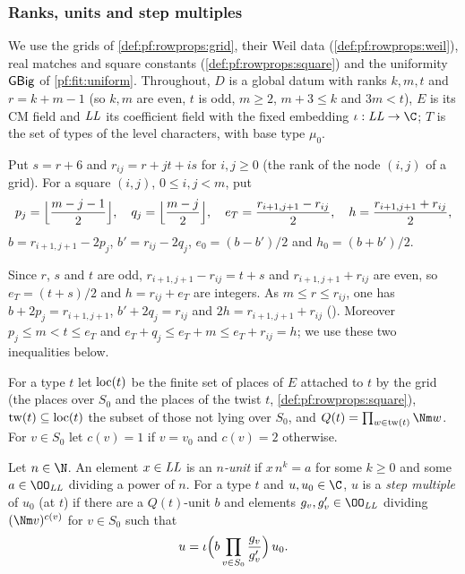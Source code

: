 \subsubsection{Ranks, units and step multiples}

We use the grids of \cref{def:pf:rowprops:grid}, their Weil data (\cref{def:pf:rowprops:weil}), real matches and square
constants (\cref{def:pf:rowprops:square}) and the uniformity $\mathsf{GBig}$ of \cref{pf:fit:uniform}. Throughout, $D$ is a
global datum with ranks $k,m,t$ and $r=k+m-1$ (so $k,m$ are even, $t$ is odd, $m\ge2$, $m+3\le k$ and $3m<t$), $E$ is
its CM field and $\mathit{LL}$ its coefficient field with the fixed embedding $\shthetaemb:\shthetaLL\to\C$; $T$ is the set
of types of the level characters, with base type $\mu_0$.

\begin{definition}\label{pf:sh-theta:ranks}
Put $s=r+6$ and $r_{ij}=r+jt+is$ for $i,j\ge0$ (the rank of the node $(i,j)$ of a grid). For a square $(i,j)$,
$0\le i,j<m$, put
\[
p_j=\Bigl\lfloor\frac{m-j-1}2\Bigr\rfloor,\quad q_j=\Bigl\lfloor\frac{m-j}2\Bigr\rfloor,\quad
e_T=\frac{r_{i+1,j+1}-r_{ij}}2,\quad h=\frac{r_{i+1,j+1}+r_{ij}}2,
\]
$b=r_{i+1,j+1}-2p_j$, $b'=r_{ij}-2q_j$, $e_0=(b-b')/2$ and $h_0=(b+b')/2$.
\end{definition}

Since $r$, $s$ and $t$ are odd, $r_{i+1,j+1}-r_{ij}=t+s$ and $r_{i+1,j+1}+r_{ij}$ are even, so $e_T=(t+s)/2$ and
$h=r_{ij}+e_T$ are integers. As $m\le r\le r_{ij}$, one has $b+2p_j=r_{i+1,j+1}$, $b'+2q_j=r_{ij}$ and
$2h=r_{i+1,j+1}+r_{ij}$ (). Moreover $p_j\le m<t\le e_T$ and
$e_T+q_j\le e_T+m\le e_T+r_{ij}=h$; we use these two inequalities below.

For a type $t$ let $\mathrm{loc}(t)$ be the finite set of places of $E$ attached to $t$ by the grid (the places over $S_0$
and the places of the twist $t$, \cref{def:pf:rowprops:square}), $\mathrm{tw}(t)\subseteq\mathrm{loc}(t)$ the subset of
those not lying over $S_0$, and $Q(t)=\prod_{w\in\shthetatw(t)}\Nm w$. For $v\in S_0$ let $c(v)=1$ if $v=v_0$ and
$c(v)=2$ otherwise.

\begin{definition}\label{pf:sh-theta:units}
Let $n\in\N$. An element $x\in\mathit{LL}$ is an \emph{$n$-unit} if $x\,n^k=a$ for some $k\ge0$ and some
$a\in\OO_{\shthetaLL}$ dividing a power of $n$. For a type $t$ and $u,u_0\in\C$, $u$ is a \emph{step multiple} of $u_0$
(at $t$) if there are a $Q(t)$-unit $b$ and elements $g_v,g'_v\in\OO_{\shthetaLL}$ dividing $(\Nm v)^{c(v)}$ for
$v\in S_0$ such that
\[
u=\iota\Bigl(b\prod_{v\in S_0}\frac{g_v}{g'_v}\Bigr)\,u_0 .
\]
\end{definition}

